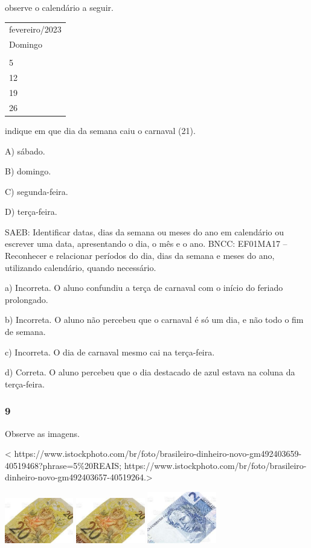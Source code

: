 observe o calendário a seguir.

\begin{longtable}[]{@{}l@{}}
\toprule
fevereiro/2023\tabularnewline
Domingo\tabularnewline
\tabularnewline
5\tabularnewline
12\tabularnewline
19\tabularnewline
26\tabularnewline
\bottomrule
\end{longtable}

indique em que dia da semana caiu o carnaval (21).

A) sábado.

B) domingo.

C) segunda-feira.

D) terça-feira.

SAEB: Identificar datas, dias da semana ou meses do ano em
calendário ou escrever uma data, apresentando o dia, o mês e o ano.
BNCC: EF01MA17 -- Reconhecer e relacionar períodos do dia, dias da semana
e meses do ano, utilizando calendário, quando necessário.

a) Incorreta. O aluno confundiu a terça de carnaval com o início do feriado prolongado.

b) Incorreta. O aluno não percebeu que o carnaval é só um dia, e não todo
o fim de semana.

c) Incorreta. O dia de carnaval mesmo cai na terça-feira.

d) Correta. O aluno percebeu que o dia destacado de azul estava na coluna da terça-feira.

\subsubsection{9}\label{section-95}

Observe as imagens.

\textless{}
https://www.istockphoto.com/br/foto/brasileiro-dinheiro-novo-gm492403659-40519468?phrase=5\%20REAIS;
https://www.istockphoto.com/br/foto/brasileiro-dinheiro-novo-gm492403657-40519264.\textgreater{}

\includegraphics[width=1.18253in,height=0.78643in]{media/image108.jpg}
\includegraphics[width=1.18253in,height=0.78643in]{media/image108.jpg}
\includegraphics[width=1.18253in,height=0.88690in]{media/image109.jpg}

